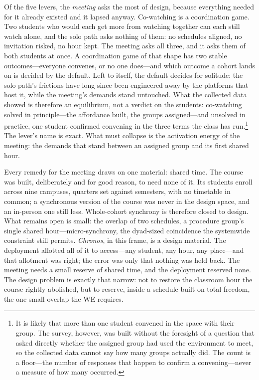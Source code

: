 Of the five levers, the \textit{meeting} asks the most of design,
because everything needed for it already existed and it lapsed anyway.
Co-watching is a coordination game. Two students who would each get
more from watching together can each still watch alone, and the solo
path asks nothing of them: no schedules aligned, no invitation risked,
no hour kept. The meeting asks all three, and it asks them of both
students at once. A coordination game of that shape has two stable
outcomes---everyone convenes, or no one does---and which outcome a
cohort lands on is decided by the default. Left to itself, the default
decides for solitude: the solo path's frictions have long since been
engineered away by the platforms that host it, while the meeting's
demands stand untouched. What the collected data showed is therefore
an equilibrium, not a verdict on the students: co-watching solved in
principle---the affordance built, the groups assigned---and unsolved
in practice, one student confirmed convening in the three terms the
class has run.\footnote{It is likely that more than one student
convened in the space with their group. The survey, however, was built
without the foresight of a question that asked directly whether the
assigned group had used the environment to meet, so the collected data
cannot say how many groups actually did. The count is a floor---the
number of responses that happen to confirm a convening---never a
measure of how many occurred.} The lever's name
is exact. What must collapse is the activation energy of the meeting:
the demands that stand between an assigned group and its first shared
hour.

Every remedy for the meeting draws on one material: shared time. The
course was built, deliberately and for good reason, to need none of
it. Its students enroll across nine campuses, quarters set against
semesters, with no timetable in common; a synchronous version of the
course was never in the design space, and an in-person one still
less. Whole-cohort
synchrony is therefore closed to design. What remains open is small:
the overlap of two schedules, a procedure group's single shared
hour---micro-synchrony, the dyad-sized coincidence the systemwide
constraint still permits. \textit{Chronos}, in this frame, is a design
material. The deployment allotted all of it to access---any student,
any hour, any place---and that allotment was right; the error was only
that nothing was held back. The meeting needs a small reserve of
shared time, and the deployment reserved none. The design problem is
exactly that narrow: not to restore the classroom hour the course
rightly abolished, but to reserve, inside a schedule built on total
freedom, the one small overlap the WE requires.

